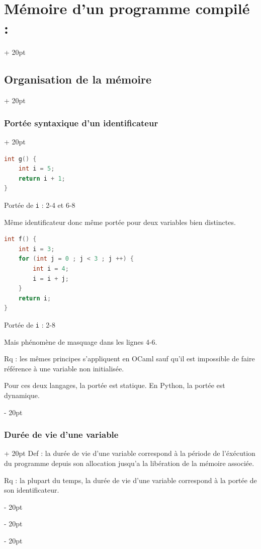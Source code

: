 \documentclass[a4paper, 12pt, twoside]{article}
\newcommand{\ind}[1][20pt]{\advance\leftskip + #1}
\newcommand{\deind}[1][20pt]{\advance\leftskip - #1}
\newenvironment{indentedenv}[1][20pt]{\par \ind[#1]}{\par \deind}
\newenvironment{indt}[2][20pt]{#2 \begin{indentedenv}[#1]}{\end{indentedenv}} %
\begin{document}
\begin{indt}{\section{Mémoire d'un programme compilé :}}
\begin{indt}{\subsection{Organisation de la mémoire}}
\begin{indt}{\subsubsection{Portée syntaxique d'un identificateur}}
\begin{lstlisting}[language=C, xleftmargin=80pt]
int g() {
    int i = 5;
    return i + 1;
}
                \end{lstlisting}
                
                Portée de \texttt{i} : 2-4 et 6-8
                
                Même identificateur donc même portée pour deux variables bien distinctes.
                
                \vspace{6pt}
                
                \begin{lstlisting}[language=C, xleftmargin=80pt]
int f() {
    int i = 3;
    for (int j = 0 ; j < 3 ; j ++) {
        int i = 4;
        i = i + j;
    }
    return i;
}
                \end{lstlisting}
                
                Portée de \texttt{i} : 2-8
                
                Mais phénomène de masquage dans les lignes 4-6.
                
                \vspace{6pt}
                
                Rq : les mêmes principes s'appliquent en OCaml sauf qu'il est impossible de faire référence à une variable non initialisée.
                
                Pour ces deux langages, la portée est statique. En Python, la portée est dynamique.
            \end{indt}
            
            \vspace{6pt}
            
            \begin{indt}{\subsubsection{Durée de vie d'une variable}}
                Def : la durée de vie d'une variable correspond à la période de l'éxécution du programme depuis son allocation jusqu'a la libération de la mémoire associée.
                
                \vspace{6pt}
                
                Rq : la plupart du temps, la durée de vie d'une variable correspond à la portée de son identificateur.
                
                \vspace{6pt}
                

\end{indt}
\end{indt}
\end{indt}
\end{document}

